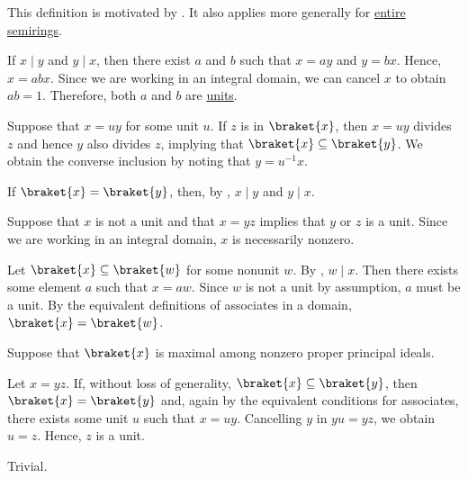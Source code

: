 \begin{definition}
\begin{thmenum}
    This definition is motivated by . It also applies more generally for \hyperref[def:entire_semiring]{entire semirings}.
  \end{thmenum}
\end{definition}
\begin{defproof}
   If \( x \mid y \) and \( y \mid x \), then there exist \( a \) and \( b \) such that \( x = ay \) and \( y = bx \). Hence, \( x = abx \). Since we are working in an integral domain, we can cancel \( x \) to obtain \( ab = 1 \). Therefore, both \( a \) and \( b \) are \hyperref[def:divisibility/unit]{units}.

   Suppose that \( x = uy \) for some unit \( u \). If \( z \) is in \( \braket{ x } \), then \( x = uy \) divides \( z \) and hence \( y \) also divides \( z \), implying that \( \braket{ x } \subseteq \braket{ y } \). We obtain the converse inclusion by noting that \( y = u^{-1} x \).

   If \( \braket{ x } = \braket{ y } \), then, by , \( x \mid y \) and \( y \mid x \).

   Suppose that \( x \) is not a unit and that \( x = yz \) implies that \( y \) or \( z \) is a unit. Since we are working in an integral domain, \( x \) is necessarily nonzero.

  Let \( \braket{ x } \subseteq \braket{ w } \) for some nonunit \( w \). By , \( w \mid x \). Then there exists some element \( a \) such that \( x = aw \). Since \( w \) is not a unit by assumption, \( a \) must be a unit. By the equivalent definitions of associates in a domain, \( \braket{ x } = \braket{ w } \).

   Suppose that \( \braket{ x } \) is maximal among nonzero proper principal ideals.

  Let \( x = yz \). If, without loss of generality, \( \braket{ x } \subseteq \braket{ y } \), then \( \braket{ x } = \braket{ y } \) and, again by the equivalent conditions for associates, there exists some unit \( u \) such that \( x = uy \). Cancelling \( y \) in \( yu = yz \), we obtain \( u = z \). Hence, \( z \) is a unit.

   Trivial.
\end{defproof}

